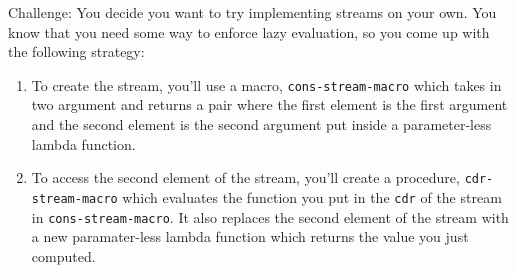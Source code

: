 \begin{blocksection}

\question Challenge: You decide you want to try implementing streams on your own. You know that you need some way 
to enforce lazy evaluation, so you come up with the following strategy:
\begin{enumerate}[1.]
\item To create the stream, you'll use a macro, \texttt{cons-stream-macro} which takes in two argument and returns a 
pair where the first element is the first argument and the second element is the second argument put inside a parameter-less
lambda function.
\item To access the second element of the stream, you'll create a procedure, \texttt{cdr-stream-macro} which evaluates the
function you put in the \texttt{cdr} of the stream in \texttt{cons-stream-macro}. It also replaces the second element of the stream
with a new paramater-less lambda function which returns the value you just computed.
\end{enumerate}
\end{blocksection}